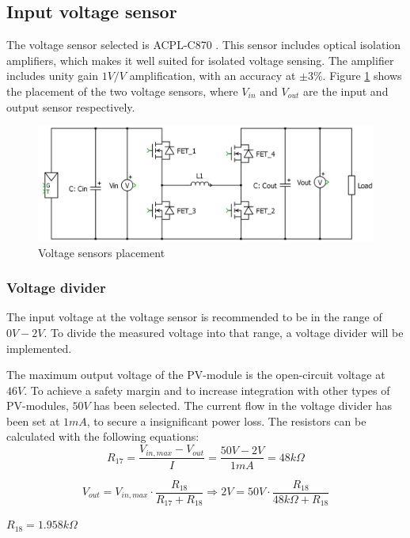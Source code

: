 \subsection{Input voltage sensor} \label{voltage_sensors}
The voltage sensor selected is ACPL-C870 \cite{voltage_sensor}. This sensor includes optical isolation amplifiers, which makes it well suited for isolated voltage sensing. The amplifier includes unity gain $1V/V$ amplification, with an accuracy at $\pm 3 \%$. Figure \ref{fig:voltage_sensors_placement} shows the placement of the two voltage sensors, where $V_{in}$ and $V_{out}$ are the input and output sensor respectively. 

\begin{figure}[htbp]
	\begin{center}
		\includegraphics[width=0.7\linewidth]{../Pictures/P1/Sensors/voltage_sensors_placement.PNG}
		\caption{Voltage sensors placement}
		\label{fig:voltage_sensors_placement}
	\end{center}
\end{figure} 

\subsubsection{Voltage divider}
The input voltage at the voltage sensor is recommended to be in the range of $0V-2V$. To divide the measured voltage into that range, a voltage divider will be implemented. 

The maximum output voltage of the PV-module is the open-circuit voltage at $46V$. To achieve a safety margin and to increase integration with other types of PV-modules, $50V$ has been selected. The current flow in the voltage divider has been set at $1mA$, to secure a insignificant power loss. The resistors can be calculated with the following equations:
\begin{equation} \label{voltage_divider_R17_in}
	R_{17} = \frac{V_{in,max}-V_{out}}{I} = \frac{50V-2V}{1mA} = 48k\Omega
\end{equation}

\begin{equation} \label{voltage_divider_R18_in}
	V_{out} = V_{in,max} \cdot \frac{R_{18}}{R_{17}+R_{18}} \Rightarrow 2V = 50V \cdot \frac{R_{18}}{48k\Omega+R_{18}}
\end{equation}
\begin{center}
	$R_{18} = 1.958k\Omega$
\end{center}

